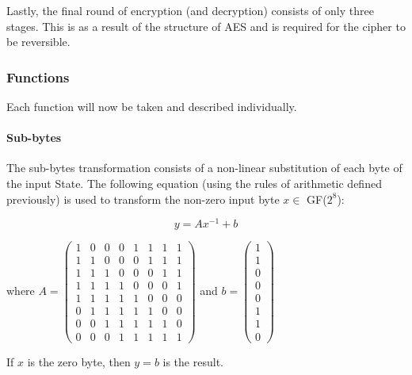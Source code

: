 \documentclass[a4paper,12pt]{report}
\begin{document}
Lastly, the final round of encryption (and decryption) consists of only three stages. This is as a result of the structure of AES and is required for the cipher to be reversible. 

\subsubsection{Functions}

Each function will now be taken and described individually. 

\paragraph{Sub-bytes}

The sub-bytes transformation consists of a non-linear substitution of each byte of the input State. The following equation (using the rules of arithmetic defined previously) is used to transform the non-zero input byte $x \in$ GF($2^{8}$): 

\begin{equation}
 y = Ax^{-1} + b
\label{eq:subbyteeq}
\end{equation}

where
$
A = 
\begin{pmatrix}
  1 & 0 & 0 & 0 & 1 & 1 & 1 & 1 \\
  1 & 1 & 0 & 0 & 0 & 1 & 1 & 1 \\
  1 & 1 & 1 & 0 & 0 & 0 & 1 & 1 \\
  1 & 1 & 1 & 1 & 0 & 0 & 0 & 1 \\
  1 & 1 & 1 & 1 & 1 & 0 & 0 & 0 \\
  0 & 1 & 1 & 1 & 1 & 1 & 0 & 0 \\
  0 & 0 & 1 & 1 & 1 & 1 & 1 & 0 \\
  0 & 0 & 0 & 1 & 1 & 1 & 1 & 1
 \end{pmatrix}
$
and
$ 
b = 
 \begin{pmatrix}
   1 \\ 1 \\ 0 \\ 0 \\ 0 \\ 1 \\ 1 \\ 0 
 \end{pmatrix}
$

If $x$ is the zero byte, then $y = b$ is the result. 
\end{document}
